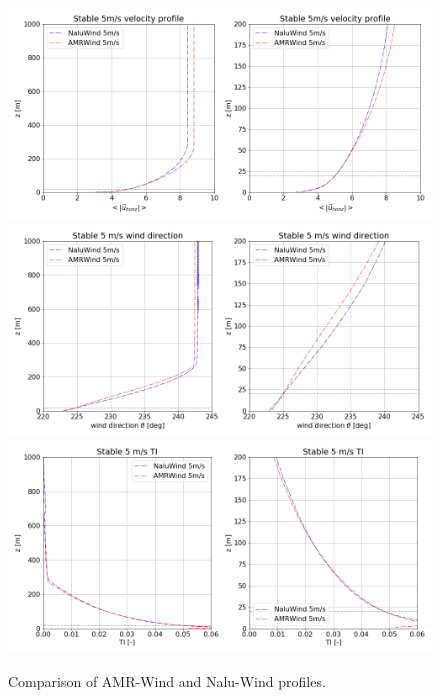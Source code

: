 \begin{figure}[hbt!]
  \label{fig:CompareAMRvsNaluProfiles}
  \centering
  \includegraphics[width=6.0in]{figures/Compare_AMRWind_NaluWind/AMRWind_NaluWind_stable_05ms_mesh2p5_2p5_2p5_WS.png}\\
  \includegraphics[width=6.0in]{figures/Compare_AMRWind_NaluWind/AMRWind_NaluWind_stable_05ms_mesh2p5_2p5_2p5_Wdir.png}\\
  \includegraphics[width=6.0in]{figures/Compare_AMRWind_NaluWind/AMRWind_NaluWind_stable_05ms_mesh2p5_2p5_2p5_TI.png}
  \caption{Comparison of AMR-Wind and Nalu-Wind profiles. }
\end{figure}

